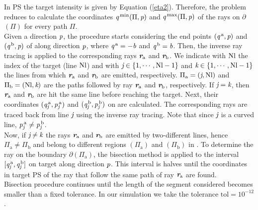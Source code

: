 In PS the target intensity is given by Equation (\ref{eta2}).
Therefore, the problem reduces to calculate the coordinates 
$\textit{q}^{\textrm{\,min}}(\Pi, \textit{p})$ and $\textit{q}^{\textrm{\,max}}(\Pi, \textit{p})$ of the rays on $\partial$$(\Pi)$ for every path $\Pi$.\\ \indent 
Given a direction $\textit{p}$, the procedure starts considering the end points $(\textit{q}^{\,\textrm{a}}, \textit{p})$ and $(\textit{q}^{\,\textrm{b}}, \textit{p})$ of  along direction $\textit{p}$, where $\textit{q}^{\,\textrm{a}} = -\textit{b}$ and $\textit{q}^{\,\textrm{b}} = \textit{b}$. Then, the 
inverse ray tracing is applied to the corresponding rays $\textit{\textbf{r}}_{\textrm{a}}$ and $\textit{\textbf{r}}_{\textrm{b}}$. We indicate with $\textrm{Nl}$ the index of the target (line $\textrm{Nl}$) and with $\textit{j}\in\{1,\cdots, \textrm{Nl}-1\}$ and $\textit{k}\in\{1,\cdots, \textrm{Nl}-1\}$ the lines from which $\textit{\textbf{r}}_{\textrm{a}}$ and $\textit{\textbf{r}}_{\textrm{b}}$ are emitted, respectively. $\Pi_\textrm{a} = (\textit{j}, \textrm{Nl})$ and $\Pi_\textrm{b} = (\textrm{Nl}, \textit{k})$ are the paths followed by ray $\textit{\textbf{r}}_{\textrm{a}}$ and $\textit{\textbf{r}}_{\textrm{b}}$, respectively. If $\textit{j}= \textit{k}$, then $\textit{\textbf{r}}_{\textrm{a}}$ and $\textit{\textbf{r}}_{\textrm{b}}$ are hit the same line before reaching the target. 
Next, their coordinates $(\textit{q}_{\textit{j}}^{\,\textrm{a}}, \textit{p}_{\textit{j}}^{\,\textrm{a}})$ and $(\textit{q}_{\textit{j}}^{\,\textrm{b}}, \textit{p}_{\textit{j}}^{\,\textrm{b}})$ on  are calculated. The corresponding rays are traced back from line $\textit{j}$ using the inverse ray tracing. Note that since $\textit{j}$ is a curved line, $ \textit{p}_{\textit{j}}^{\,\textrm{a}}\neq \textit{p}_{\textit{j}}^{\,\textrm{b}}$.
\\ \indent Now, if $\textit{j}\neq \textit{k}$ the rays $\textit{\textbf{r}}_\textrm{a}$ and $\textit{\textbf{r}}_\textrm{b}$ are emitted by two-different lines, hence $\Pi_{\textrm{a}}\neq \Pi_{\textrm{b}}$ and belong to different regions $(\Pi_{\textrm{a}})$ and $(\Pi_{\textrm{b}})$ in . To determine the ray on the boundary $\partial$$(\Pi_{\textrm{a}})$, the bisection method is applied to the interval $[\textit{q}_{\textit{j}}^{\,\textrm{a}}, \textit{q}_{\textit{j}}^{\,\textrm{b}}]$ on target \set{}{}{} along direction $\textit{p}$. This interval is halves until the coordinates in target PS of the ray that follow the same path of ray $\textit{\textbf{r}}_{\textrm{a}}$ are found. \\ \indent Bisection procedure continues until the length of the segment considered becomes smaller than a fixed tolerance. In our simulation we take the tolerance $\textrm{tol}= 10^{-12}$. 
